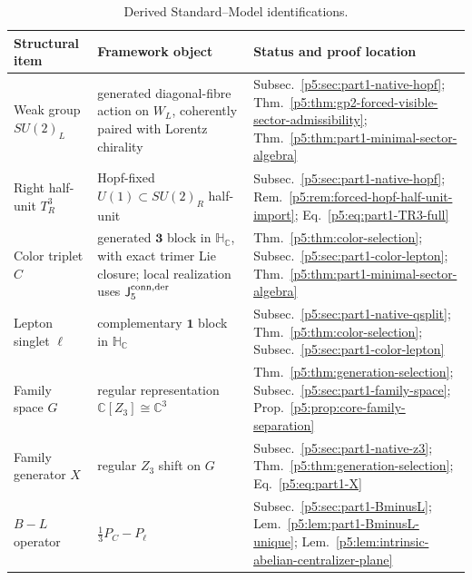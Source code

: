 \documentclass[12pt,a4paper]{article}
\begin{document}
\begin{table}[H]
\centering
\caption[Derived Standard-Model identifications]{Derived Standard--Model identifications.}
\label{p5:tab:selected-identifications}
\renewcommand{\arraystretch}{1.2}
\begin{tabularx}{\textwidth}{>{\raggedright\arraybackslash}p{}
                                >{\raggedright\arraybackslash}X
                                >{\raggedright\arraybackslash}p{}}
\toprule
\textbf{Structural item} & \textbf{Framework object} & \textbf{Status and proof location} \\
\midrule
Weak group \(SU(2)_L\) &
generated diagonal-fibre action on \(W_L\), coherently paired with Lorentz chirality &
Subsec.~\ref{p5:sec:part1-native-hopf};
Thm.~\ref{p5:thm:gp2-forced-visible-sector-admissibility};
Thm.~\ref{p5:thm:part1-minimal-sector-algebra} \\

Right half-unit \(T_R^3\) &
Hopf-fixed \(U(1)\subset SU(2)_R\) half-unit &
Subsec.~\ref{p5:sec:part1-native-hopf};
Rem.~\ref{p5:rem:forced-hopf-half-unit-import};
Eq.~\eqref{p5:eq:part1-TR3-full} \\

Color triplet \(C\) &
generated \(\mathbf 3\) block in \(\mathbb H_{\mathbb C}\), with exact
trimer Lie closure; local realization uses \(\mathsf J_5^{\rm conn,der}\) &
Thm.~\ref{p5:thm:color-selection};
Subsec.~\ref{p5:sec:part1-color-lepton};
Thm.~\ref{p5:thm:part1-minimal-sector-algebra} \\

Lepton singlet \(\ell\) &
complementary \(\mathbf 1\) block in \(\mathbb H_{\mathbb C}\) &
Subsec.~\ref{p5:sec:part1-native-qsplit};
Thm.~\ref{p5:thm:color-selection};
Subsec.~\ref{p5:sec:part1-color-lepton} \\

Family space \(G\) &
regular representation \(\mathbb C[Z_3]\cong \mathbb C^3\) &
Thm.~\ref{p5:thm:generation-selection};
Subsec.~\ref{p5:sec:part1-family-space};
Prop.~\ref{p5:prop:core-family-separation} \\

Family generator \(X\) &
regular \(Z_3\) shift on \(G\) &
Subsec.~\ref{p5:sec:part1-native-z3};
Thm.~\ref{p5:thm:generation-selection};
Eq.~\eqref{p5:eq:part1-X} \\

\(B-L\) operator &
\(
\frac13 P_C-P_\ell
\)
&
Subsec.~\ref{p5:sec:part1-BminusL};
Lem.~\ref{p5:lem:part1-BminusL-unique};
Lem.~\ref{p5:lem:intrinsic-abelian-centralizer-plane} \\


\end{tabularx}
\end{table}
\end{document}

